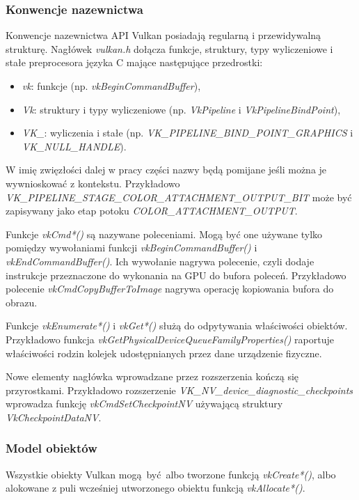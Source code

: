 \subsubsection{Konwencje nazewnictwa}
Konwencje nazewnictwa API Vulkan posiadają regularną i przewidywalną strukturę.
Nagłówek \textit{vulkan.h} dołącza funkcje, struktury, typy wyliczeniowe i stałe preprocesora języka C mające następujące przedrostki:
\begin{itemize}
	\item \textit{vk}: funkcje (np. \textit{vkBeginCommandBuffer}),
	\item \textit{Vk}: struktury i typy wyliczeniowe (np. \textit{VkPipeline} i  \textit{VkPipelineBindPoint}),
	\item \textit{VK\_}: wyliczenia i stałe (np. \textit{VK\_PIPELINE\_BIND\_POINT\_GRAPHICS} i \textit{VK\_NULL\_HANDLE}).
\end{itemize}
W imię zwięzłości dalej w pracy części nazwy będą pomijane jeśli można je wywnioskować z kontekstu. Przykładowo \textit{VK\_PIPELINE\_STAGE\_COLOR\_ATTACHMENT\_OUTPUT\_BIT} może być zapisywany jako etap potoku \textit{COLOR\_ATTACHMENT\_OUTPUT}.

Funkcje \textit{vkCmd*()} są nazywane poleceniami.
Mogą być one używane tylko pomiędzy wywołaniami funkcji \textit{vkBeginCommandBuffer()} i \textit{vkEndCommandBuffer()}. Ich wywołanie nagrywa polecenie, czyli dodaje instrukcje przeznaczone do wykonania na GPU do bufora poleceń.
Przykładowo polecenie \textit{vkCmdCopyBufferToImage} nagrywa operację kopiowania bufora do obrazu.

Funkcje \textit{vkEnumerate*()} i \textit{vkGet*()} służą do odpytywania właściwości obiektów. Przykładowo funkcja \textit{vkGetPhysicalDeviceQueueFamilyProperties()} raportuje właściwości rodzin kolejek udostępnianych przez dane urządzenie fizyczne.

Nowe elementy nagłówka wprowadzane przez rozszerzenia kończą się przyrostkami. Przykładowo rozszerzenie \textit{VK\_NV\_device\_diagnostic\_checkpoints} wprowadza funkcję \textit{vkCmdSetCheckpointNV} używającą struktury \textit{VkCheckpointDataNV}.

\subsubsection{Model obiektów}

Wszystkie obiekty Vulkan mogą być albo tworzone funkcją \textit{vkCreate*()}, albo alokowane z puli wcześniej utworzonego obiektu funkcją \textit{vkAllocate*()}.

